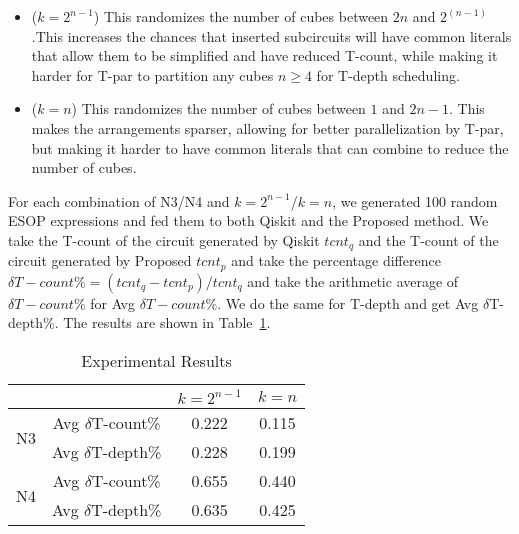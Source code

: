\begin{itemize}
\item ($k=2^{n-1}$) This randomizes the number of cubes between $2n$ and $2^(n-1)$.This increases the chances
  that inserted subcircuits will have common literals that allow them to be simplified and have reduced T-count,
  while making it harder for T-par to partition any cubes $n \geq 4$ for T-depth scheduling.
\item ($k=n$) This randomizes the number of cubes between $1$ and $2n-1$. This makes the arrangements sparser,
  allowing for better parallelization by T-par, but making it harder to have common literals that can combine
  to reduce the number of cubes.
\end{itemize}

For each combination of N3/N4 and $k=2^{n-1}$/$k=n$, we generated 100 random ESOP expressions and fed them
to both Qiskit and the Proposed method. We take the T-count of the circuit generated by Qiskit $tcnt_q$ and
the T-count of the circuit generated by Proposed $tcnt_p$ and take the percentage difference
$\delta T-count\% = (tcnt_q - tcnt_p) / tcnt_q$ and take the arithmetic average of $\delta T-count\%$ for
Avg $\delta T-count\%$. We do the same for T-depth and get Avg $\delta$T-depth\%. The results are
shown in Table~\ref{table-results}.

\begin{table}[t]
  \begin{center}
    \scalebox{1.0} {
      \begin{tabular}{c|c|c|c}\hline
                            &                   & $k=2^{n-1}$ & $k=n$    \\\hline
        \multirow{2}{*}{N3} & Avg $\delta$T-count\% &  0.222      & 0.115    \\\cline{2-4}
                            & Avg $\delta$T-depth\% &  0.228      & 0.199    \\\hline
        \multirow{2}{*}{N4} & Avg $\delta$T-count\% &  0.655      & 0.440    \\\cline{2-4}
                            & Avg $\delta$T-depth\% &  0.635      & 0.425    \\\hline

      \end{tabular}        
    }
  \end{center}
  \caption{Experimental Results}
  \label{table-results}
\end{table}

